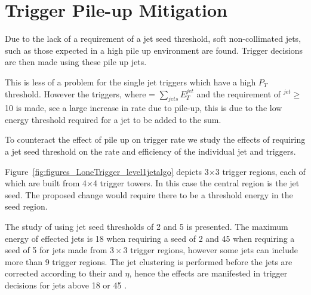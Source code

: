 \section{\Lone Trigger Pile-up Mitigation} %
\label{sub:lone_trigger_pile_up_mitigation}
Due to the lack of a requirement of a jet seed threshold, soft non-collimated 
jets, such as those expected in a high pile up environment are found. Trigger 
decisions are then made using these pile up jets.

This is less of a problem for the single jet triggers which have a high $P_{T}$ 
threshold. However the \HT triggers, where \HT = $\sum_{jets}E_{T}^{jet}$ and 
the requirement of \ET$^{jet} \geq $10 \GeV is made,
see a large increase in rate due to pile-up, this is due to the low energy 
threshold required for a jet to be added to the \HT sum.

To counteract the effect of pile up on trigger rate we study the effects of 
requiring a jet seed threshold on the rate and efficiency of the individual jet 
and \HT triggers.

Figure~\ref{fig:figures_LoneTrigger_level1jetalgo} depicts 3$\times$3 trigger
regions, each of which are built from 4$\times$4 trigger towers.
In this case the central region is the jet seed. The proposed change would 
require there to be a threshold energy in the seed region.

The study of using jet seed thresholds of 2 and 5 \GeV is presented. The 
maximum energy of effected jets is 18 \GeV when requiring a seed of 2 \GeV and 
45 \GeV when requiring a seed of 5 \GeV for jets made from $3\times3$ trigger 
regions, however some jets can include more than 9 trigger regions. The jet 
clustering is performed before the \Lone jets are corrected according 
to their \ET and $\eta$, hence the effects are manifested in trigger decisions 
for \Lone jets above 18 or 45 \GeV.




